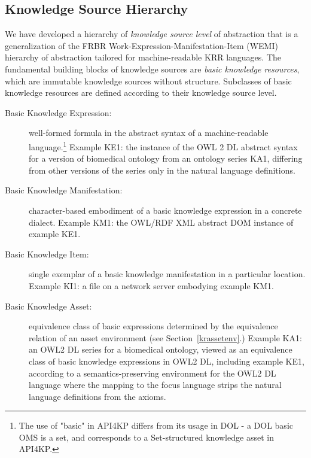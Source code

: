 \documentclass[runningheads]{llncs}
\begin{document}

\subsection{Knowledge Source Hierarchy}
We have developed a hierarchy of \emph{knowledge source level} of abstraction that is a generalization of the FRBR \cite{FRBR} Work-Expression-Manifestation-Item (WEMI) hierarchy of abstraction tailored for machine-readable KRR languages. The fundamental building blocks of knowledge sources are \emph{basic knowledge resources}, which are immutable knowledge sources without structure.
Subclasses of basic knowledge resources are defined according to their knowledge source level. 
\begin{description}
\item[Basic Knowledge Expression:] well-formed formula in the abstract syntax of a machine-readable language.\footnote{The use of "basic" in API4KP differs from its usage in DOL - a DOL basic OMS is a set, and corresponds to a Set-structured knowledge asset in API4KP.}
Example KE1: the instance of the OWL 2 DL abstract syntax for a version of biomedical ontology from an ontology series KA1, differing from other versions of the series only in the natural language definitions.
\item[Basic Knowledge Manifestation:] character-based embodiment of a basic knowledge expression in a concrete dialect. Example KM1: the OWL/RDF XML abstract DOM instance of example KE1.
\item[Basic Knowledge Item:] single exemplar of a basic knowledge manifestation in a particular location. Example KI1: a file on a network server embodying example KM1.
\item[Basic Knowledge Asset:] equivalence class of basic expressions determined by the equivalence relation of an asset environment (see Section~\ref{krassetenv}.) Example KA1: an OWL2 DL series for a biomedical ontology, viewed as an equivalence class of basic knowledge expressions in OWL2 DL, including example KE1, according to a semantics-preserving environment for the OWL2 DL language where the mapping to the focus language strips the natural language definitions from the axioms.
\end{description}
\end{document}
